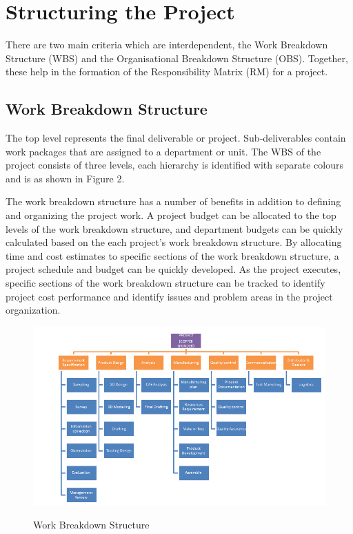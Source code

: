 \chapter*{Structuring the Project}
\noindent There are two main criteria which are interdependent, the Work Breakdown Structure (WBS) and the Organisational Breakdown Structure (OBS). Together, these help in the formation of the Responsibility Matrix (RM) for a project.

\section{ Work Breakdown Structure } \label{ Work Breakdown Structure }
\noindent The top level represents the final deliverable or project. Sub-deliverables contain work packages that are assigned to a department or unit. The WBS of the project consists of three levels, each hierarchy is identified with separate colours and is as shown in Figure 2.

\noindent The work breakdown structure has a number of benefits in addition to defining and organizing the project work. A project budget can be allocated to the top levels of the work breakdown structure, and department budgets can be quickly calculated based on the each project's work breakdown structure. By allocating time and cost estimates to specific sections of the work breakdown structure, a project schedule and budget can be quickly developed. As the project executes, specific sections of the work breakdown structure can be tracked to identify project cost performance and identify issues and problem areas in the project organization.

\begin{figure}[H]
\centering
{\includegraphics[scale=0.8]{wbs.png}}
\caption{Work Breakdown Structure}
\end{figure}

